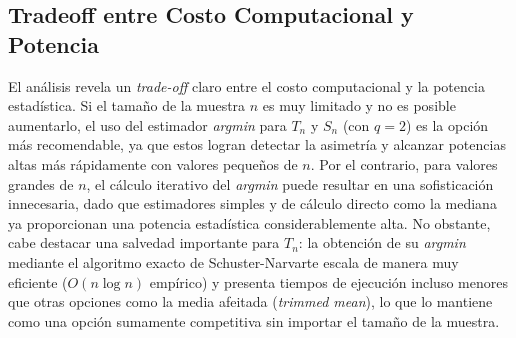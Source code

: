 \subsection{Tradeoff entre Costo Computacional y Potencia}

El análisis revela un \textit{trade-off} claro entre el costo computacional y la potencia estadística. Si el tamaño de la muestra $n$ es muy limitado y no es posible aumentarlo, el uso del estimador \textit{argmin} para $T_n$ y $S_n$ (con $q=2$) es la opción más recomendable, ya que estos logran detectar la asimetría y alcanzar potencias altas más rápidamente con valores pequeños de $n$. Por el contrario, para valores grandes de $n$, el cálculo iterativo del \textit{argmin} puede resultar en una sofisticación innecesaria, dado que estimadores simples y de cálculo directo como la mediana ya proporcionan una potencia estadística considerablemente alta. No obstante, cabe destacar una salvedad importante para $T_n$: la obtención de su \textit{argmin} mediante el algoritmo exacto de Schuster-Narvarte escala de manera muy eficiente ($O(n \log n)$ empírico) y presenta tiempos de ejecución incluso menores que otras opciones como la media afeitada (\textit{trimmed mean}), lo que lo mantiene como una opción sumamente competitiva sin importar el tamaño de la muestra.